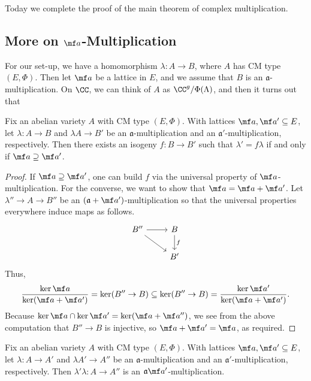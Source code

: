 \documentclass[../notes.tex]{subfiles}
\begin{document}
Today we complete the proof of the main theorem of complex multiplication.

\subsection{More on \texorpdfstring{$\mf a$}{ a}-Multiplication}
For our set-up, we have a homomorphism $\lambda\colon A\to B$, where $A$ has CM type $(E,\Phi)$. Then let $\mf a$ be a lattice in $E$, and we assume that $B$ is an $\mathfrak a$-multiplication. On $\CC$, we can think of $A$ as $\CC^g/\Phi(\Lambda)$, and then it turns out that
\begin{proposition}
	Fix an abelian variety $A$ with CM type $(E,\Phi)$. With lattices $\mf a,\mf a'\subseteq E$, let $\lambda\colon A\to B$ and $\lambda A\to B'$ be an $\mathfrak a$-multiplication and an $\mathfrak a'$-multiplication, respectively. Then there exists an isogeny $f\colon B\to B'$ such that $\lambda'=f\lambda$ if and only if $\mf a\supseteq\mf a'$.
\end{proposition}
\begin{proof}
	If $\mf a\supseteq\mf a'$, one can build $f$ via the universal property of $\mf a$-multiplication. For the converse, we want to show that $\mf a=\mf a+\mf a'$. Let $\lambda''\to A\to B''$ be an $(\mathfrak a+\mf a')$-multiplication so that the universal properties everywhere induce maps as follows.
	\[\begin{tikzcd}
		{B''} & B \\
		& {B'}
		\arrow[from=1-1, to=1-2]
		\arrow[from=1-1, to=2-2]
		\arrow["f", from=1-2, to=2-2]
	\end{tikzcd}\]
	Thus,
	\[\frac{\ker\mf a}{\ker(\mf a+\mf a')}=\ker(B''\to B)\subseteq\ker(B''\to B)=\frac{\ker\mf a'}{\ker(\mf a+\mf a')}.\]
	Because $\ker\mf a\cap\ker\mf a'=\ker(\mf a+\mf a'')$, we see from the above computation that $B''\to B$ is injective, so $\mf a+\mf a'=\mf a$, as required.
\end{proof}
\begin{proposition} \label{prop:compose-a-mult}
	Fix an abelian variety $A$ with CM type $(E,\Phi)$. With lattices $\mf a,\mf a'\subseteq E$, let $\lambda\colon A\to A'$ and $\lambda A'\to A''$ be an $\mathfrak a$-multiplication and an $\mathfrak a'$-multiplication, respectively. Then $\lambda'\lambda\colon A\to A''$ is an $\mathfrak a\mf a'$-multiplication.
\end{proposition}
\end{document}
